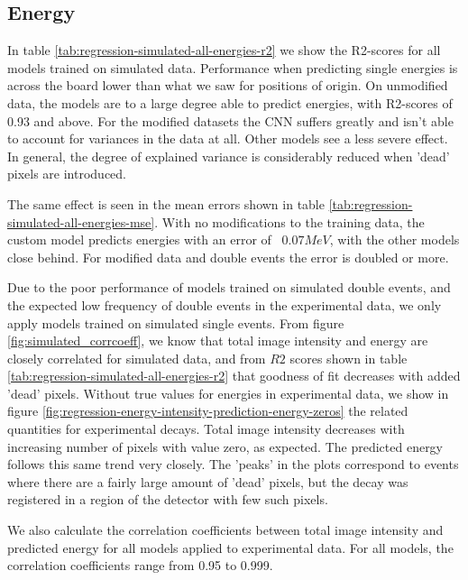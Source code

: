 \subsection{Energy}
In table \ref{tab:regression-simulated-all-energies-r2} we show the R2-scores for all
models trained on simulated data.
Performance when predicting single energies is across the board lower than what we saw
for positions of origin. On unmodified data, the models are to a large degree able to
predict energies, with R2-scores of 0.93 and above. For the modified datasets the CNN
suffers greatly and isn't able to account for variances in the data at all. Other models
see a less severe effect. In general, the degree of explained variance is considerably
reduced when 'dead' pixels are introduced.

The same effect is seen in the mean errors shown in table \ref{tab:regression-simulated-all-energies-mse}.
With no modifications to the training data, the custom model predicts energies with an error of
~$0.07MeV$, with the other models close behind. For modified data and double events the error
is doubled or more.


Due to the poor performance of models trained on simulated double events, and the
expected low frequency of double events in the experimental data, we only apply models
trained on simulated single events. From figure \ref{fig:simulated_corrcoeff}, we know
that total image intensity and energy are closely correlated for simulated data,
and from $R2$ scores shown in table \ref{tab:regression-simulated-all-energies-r2}
that goodness of fit decreases with added 'dead' pixels. Without true values for
energies in experimental data, we show in figure \ref{fig:regression-energy-intensity-prediction-energy-zeros}
the related quantities for experimental decays. Total image intensity decreases with
increasing number of pixels with value zero, as expected. The predicted energy
follows this same trend very closely. The 'peaks' in the plots correspond to events
where there are a fairly large amount of 'dead' pixels, but the decay was registered
in a region of the detector with few such pixels.

We also calculate the correlation coefficients between total image intensity and
predicted energy for all models applied to experimental data. For all models, the
correlation coefficients range from 0.95 to 0.999.


